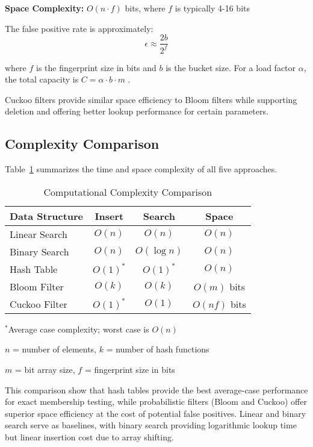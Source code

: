 \textbf{Space Complexity:} $O(n \cdot f)$ bits, where $f$ is typically 4-16 bits

The false positive rate is approximately:
\begin{equation}
\epsilon \approx \frac{2b}{2^f}
\end{equation}

where $f$ is the fingerprint size in bits and $b$ is the bucket size. For a load factor $\alpha$, the total capacity is $C = \alpha \cdot b \cdot m$ \cite{fan2014cuckoo}.

Cuckoo filters provide similar space efficiency to Bloom filters while supporting deletion and offering better lookup performance for certain parameters.

\subsection{Complexity Comparison}

Table~\ref{tab:complexity} summarizes the time and space complexity of all five approaches.

\begin{table}[h]
\centering
\caption{Computational Complexity Comparison}
\label{tab:complexity}
\begin{tabular}{@{}lccc@{}}
\toprule
\textbf{Data Structure} & \textbf{Insert} & \textbf{Search} & \textbf{Space} \\
\midrule
Linear Search & $O(n)$ & $O(n)$ & $O(n)$ \\
Binary Search & $O(n)$ & $O(\log n)$ & $O(n)$ \\
Hash Table & $O(1)^*$ & $O(1)^*$ & $O(n)$ \\
Bloom Filter & $O(k)$ & $O(k)$ & $O(m)$ bits \\
Cuckoo Filter & $O(1)^*$ & $O(1)$ & $O(nf)$ bits \\
\bottomrule
\end{tabular}
\begin{tablenotes}
\small
\item $^*$Average case complexity; worst case is $O(n)$
\item $n$ = number of elements, $k$ = number of hash functions
\item $m$ = bit array size, $f$ = fingerprint size in bits
\end{tablenotes}
\end{table}

This comparison show that hash tables provide the best average-case performance for exact membership testing, while probabilistic filters (Bloom and Cuckoo) offer superior space efficiency at the cost of potential false positives. Linear and binary search serve as baselines, with binary search providing logarithmic lookup time but linear insertion cost due to array shifting.
